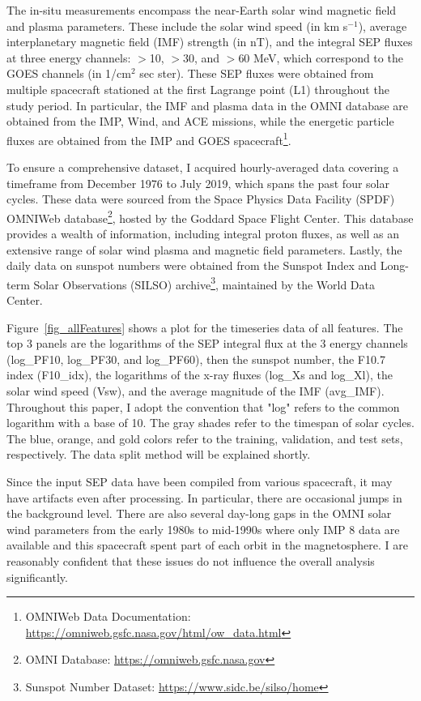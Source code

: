 The in-situ measurements encompass the near-Earth solar wind magnetic field and plasma parameters. These include the solar wind speed (in km s$^{-1}$), average interplanetary magnetic field (IMF) strength (in nT), and the integral SEP fluxes at three energy channels: $>$10, $>$30, and $>$60 MeV, which correspond to the GOES channels (in 1/cm$^2$ sec ster). These SEP fluxes were obtained from multiple spacecraft stationed at the first Lagrange point (L1) throughout the study period.
In particular, the IMF and plasma data in the OMNI database are obtained from the IMP, Wind, and ACE missions, while the energetic particle fluxes are obtained from the IMP and GOES spacecraft\footnote{OMNIWeb Data Documentation: \url{https://omniweb.gsfc.nasa.gov/html/ow_data.html}}.

To ensure a comprehensive dataset, I acquired hourly-averaged data covering a timeframe from December 1976 to July 2019, which spans the past four solar cycles. These data were sourced from the Space Physics Data Facility (SPDF) OMNIWeb database\footnote{OMNI Database: \url{https://omniweb.gsfc.nasa.gov}}, hosted by the Goddard Space Flight Center. This database provides a wealth of information, including integral proton fluxes, as well as an extensive range of solar wind plasma and magnetic field parameters.
Lastly, the daily data on sunspot numbers were obtained from the Sunspot Index and Long-term Solar Observations (SILSO) archive\footnote{Sunspot Number Dataset: \url{https://www.sidc.be/silso/home}}, maintained by the World Data Center.

Figure~\ref{fig_allFeatures} shows a plot for the timeseries data of all features.
The top 3 panels are the logarithms of the SEP integral flux at the 3 energy channels (log\_PF10, log\_PF30, and log\_PF60), then the sunspot number, the F10.7 index (F10\_idx), the logarithms of the x-ray fluxes (log\_Xs and log\_Xl), the solar wind speed (Vsw), and the average magnitude of the IMF (avg\_IMF).
Throughout this paper, I adopt the convention that "log" refers to the common logarithm with a base of 10.
The gray shades refer to the timespan of solar cycles.
The blue, orange, and gold colors refer to the training, validation, and test sets, respectively. The data split method will be explained shortly.

Since the input SEP data have been compiled from various spacecraft, it may have artifacts even after processing. In particular, there are occasional jumps in the background level. There are also several day-long gaps in the OMNI solar wind parameters from the early 1980s to mid-1990s where only IMP 8 data are available and this spacecraft spent part of each orbit in the magnetosphere. I are reasonably confident that these issues do not influence the overall analysis significantly.

